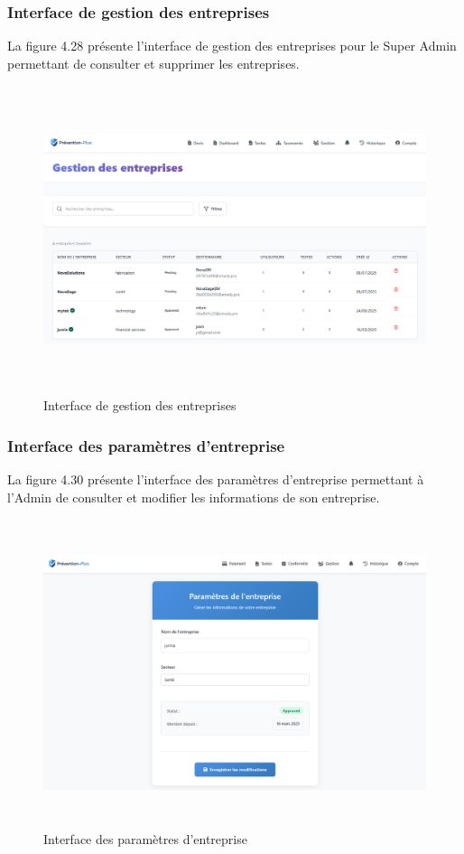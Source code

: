 \subsubsection{Interface de gestion des entreprises}
\noindent La figure 4.28 présente l'interface de gestion des entreprises pour le Super Admin permettant de consulter et supprimer les entreprises.

\begin{figure}[H]
    \centering
    \includegraphics[width=14cm,height=9cm]{images/gestionentreprises.PNG}
    \caption{Interface de gestion des entreprises}
\end{figure}


\subsubsection{Interface des paramètres d'entreprise}
\noindent La figure 4.30 présente l'interface des paramètres d'entreprise permettant à l'Admin de consulter et modifier les informations de son entreprise.

\begin{figure}[H]
    \centering
    \includegraphics[width=14cm,height=9cm]{images/parametresentreprise.PNG}
    \caption{Interface des paramètres d'entreprise}
\end{figure}

